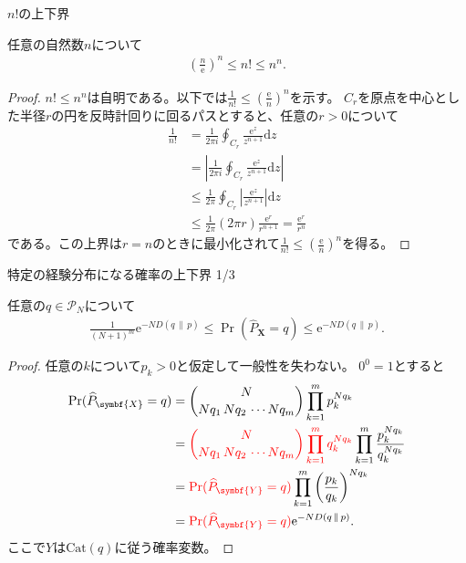 \documentclass[lualatex,handout]{beamer}
\newcommand{\mycolor}[2]{%
  \begingroup
  \colorlet{currentcolor}{.}%
  \color{#1}#2%
  \color{currentcolor}%
  \endgroup
}
\newcommand{\emm}[1]{\mycolor{red}{#1}}
\newcommand\KL[2]{D\left(#1\,\|\,#2\right)}
\theoremstyle{definition}
\begin{document}
\begin{frame}{$n!$の上下界}
\footnotesize
\begin{lemma}
任意の自然数$n$について
\begin{align*}
\left(\frac{n}{\mathrm{e}}\right)^n\le n!\le n^n.
\end{align*}
\vspace{-1em}
\begin{proof}
$n!\le n^n$は自明である。以下では$\frac1{n!}\le \left(\frac{\mathrm{e}}{n}\right)^n$を示す。
%
$C_r$を原点を中心とした半径$r$の円を反時計回りに回るパスとすると、任意の$r>0$について
\begin{align*}
\frac1{n!} &= \frac1{2\pi i} \oint_{C_r} \frac{\mathrm{e}^z}{z^{n+1}}\mathrm{d}z\\
 &= \left|\frac1{2\pi i} \oint_{C_r} \frac{\mathrm{e}^z}{z^{n+1}}\mathrm{d}z\right|\\
&\le \frac1{2\pi } \oint_{C_r} \left|\frac{\mathrm{e}^z}{z^{n+1}}\right|\mathrm{d}z\\
&\le \frac1{2\pi } (2\pi r) \frac{\mathrm{e}^r}{r^{n+1}} = \frac{\mathrm{e}^r}{r^n}
\end{align*}
である。この上界は$r=n$のときに最小化されて$\frac1{n!}\le\left(\frac{\mathrm{e}}{n}\right)^n$を得る。
\end{proof}
\end{lemma}
\end{frame}
\fi

\begin{frame}{特定の経験分布になる確率の上下界 1/3}
\footnotesize
\begin{lemma}
任意の$q\in\mathcal{P}_N$について
\begin{align*}
\frac1{(N+1)^m}\mathrm{e}^{-N \KL{q}{p}}\le
\Pr(\widehat{P}_{\symbf{X}} = q)
\le \mathrm{e}^{-N \KL{q}{p}}.
\end{align*}
\end{lemma}
\begin{proof}
任意の$k$について$p_k>0$と仮定して一般性を失わない。
$0^0=1$とすると
\begin{align*}
\Pr(\widehat{P}_{\symbf{X}}= q) &= \binom{N}{Nq_1\,Nq_2\,\dotsm Nq_m} \prod_{k=1}^m p_k^{Nq_k}\\
 &= \emm{\binom{N}{Nq_1\,Nq_2\,\dotsm Nq_m} \prod_{k=1}^m q_k^{Nq_k}}\prod_{k=1}^m\frac{p_k^{Nq_k}}{q_k^{Nq_k}}\\
 &= \emm{\Pr(\widehat{P}_{\symbf{Y}}= q)}\prod_{k=1}^m\left(\frac{p_k}{q_k}\right)^{Nq_k}\\
 &=\emm{\Pr(\widehat{P}_{\symbf{Y}}= q)}\mathrm{e}^{-N \KL{q}{p}}.
\end{align*}
ここで$Y$は$\mathrm{Cat}(q)$に従う確率変数。
\end{proof}
\end{frame}
\end{document}
